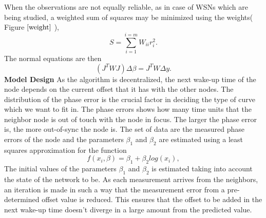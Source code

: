 \documentclass[journal]{IEEEtran}
\begin{document}
When the observations are not equally reliable, as in case of WSNs
which are being studied, a weighted sum of squares may be minimized
using the weights( Figure $\ref{weight}$ ),
\begin{equation}
    S=\sum_{i=1}^{i=m}W_{ii}r_i^2.
\end{equation}
The normal equations are then
\begin{equation}
    \left(J^TWJ\right)\Delta  \beta=J^TW\Delta y.
\end{equation}
\textbf{Model Design}\newline
As the algorithm is decentralized, the next wake-up time of the node depends on the current offset that it
has with the other nodes. The distribution of the phase error is the
crucial factor in deciding the type of curve which we want to fit
in. The phase errors shows how many time units that the neighbor node is
out of touch with the node in focus. The larger the phase error is, the
more out-of-sync the node is.\newline 
The set of data are the measured phase errors of the node and the
parameters $\beta_1$ and $\beta_2$ are estimated using a least
squares approximation for the function 
\begin{equation}
 f(x_i,\beta)= \beta _1 + \beta_2log(x_i),
\end{equation}
The initial values of the parameters $\beta_1$ and $\beta_2$ is estimated taking into account
the state of the network to be. \newline
As each measurement arrives from the neighbors, an iteration is made in such a way that
the measurement error from a pre-determined offset value is reduced.
This ensures that the offset to be added in the next wake-up
time doesn't diverge in a large amount from the predicted value.
\end{document}
